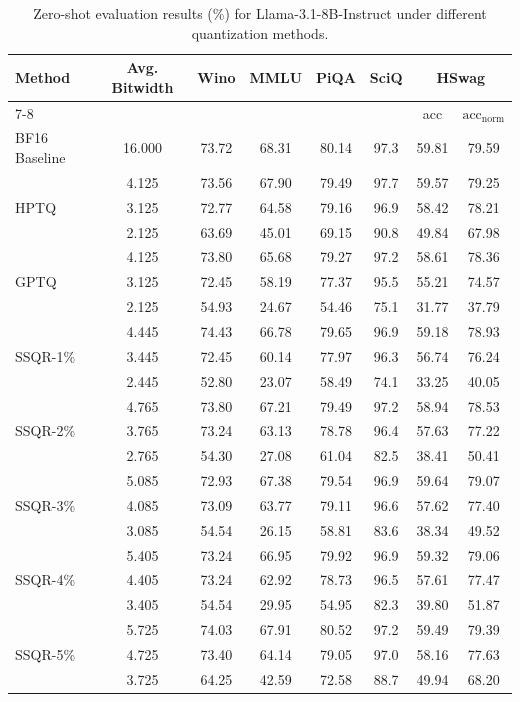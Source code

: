 \documentclass{article} %
\begin{document}
\begin{table}[htpb]
\caption{Zero-shot evaluation results (\%) for Llama-3.1-8B-Instruct under different quantization methods.}
\label{tab:llama3.1_8b_eval_tasks}
\begin{center}
\begin{tabular}{lccccccc}
\toprule
Method & Avg. Bitwidth & Wino & MMLU & PiQA & SciQ & \multicolumn{2}{c}{HSwag}  \\
\cmidrule(r){7-8}
      &           &      &      &      &      & acc & $\text{acc}_\text{norm}$ \\
\midrule
BF16 Baseline & 16.000 & 73.72 & 68.31 & 80.14 & 97.3 & 59.81 & 79.59 \\
\midrule
\multirow{3}{*}{HPTQ} 
 & 4.125 & 73.56 & 67.90 & 79.49 & 97.7 & 59.57 & 79.25 \\
 & 3.125 & 72.77 & 64.58 & 79.16 & 96.9 & 58.42 & 78.21 \\
 & 2.125 & 63.69 & 45.01 & 69.15 & 90.8 & 49.84 & 67.98 \\
\midrule
\multirow{3}{*}{GPTQ} & 4.125 & 73.80 & 65.68 & 79.27 & 97.2 & 58.61 & 78.36 \\
           & 3.125 & 72.45 & 58.19 & 77.37 & 95.5 & 55.21 & 74.57 \\
           & 2.125 & 54.93 & 24.67 & 54.46 & 75.1 & 31.77 & 37.79 \\
\midrule
\multirow{3}{*}{SSQR-1\%} 
 & 4.445 & 74.43 & 66.78 & 79.65 & 96.9 & 59.18 & 78.93 \\
 & 3.445 & 72.45 & 60.14 & 77.97 & 96.3 & 56.74 & 76.24 \\
 & 2.445 & 52.80 & 23.07 & 58.49 & 74.1 & 33.25 & 40.05 \\
\midrule
\multirow{3}{*}{SSQR-2\%}  
 & 4.765 & 73.80 & 67.21 & 79.49 & 97.2 & 58.94 & 78.53 \\
 & 3.765 & 73.24 & 63.13 & 78.78 & 96.4 & 57.63 & 77.22 \\
 & 2.765 & 54.30 & 27.08 & 61.04 & 82.5 & 38.41 & 50.41 \\
\midrule
\multirow{3}{*}{SSQR-3\%}  
 & 5.085 & 72.93 & 67.38 & 79.54 & 96.9 & 59.64 & 79.07 \\
 & 4.085 & 73.09 & 63.77 & 79.11 & 96.6 & 57.62 & 77.40 \\
 & 3.085 & 54.54 & 26.15 & 58.81 & 83.6 & 38.34 & 49.52 \\
\midrule
\multirow{3}{*}{SSQR-4\%}  
 & 5.405 & 73.24 & 66.95 & 79.92 & 96.9 & 59.32 & 79.06 \\
 & 4.405 & 73.24 & 62.92 & 78.73 & 96.5 & 57.61 & 77.47 \\
 & 3.405 & 54.54 & 29.95 & 54.95 & 82.3 & 39.80 & 51.87 \\
\midrule
\multirow{3}{*}{SSQR-5\%}  
 & 5.725 & 74.03 & 67.91 & 80.52 & 97.2 & 59.49 & 79.39 \\
 & 4.725 & 73.40 & 64.14 & 79.05 & 97.0 & 58.16 & 77.63 \\
 & 3.725 & 64.25 & 42.59 & 72.58 & 88.7 & 49.94 & 68.20 \\
\bottomrule
\end{tabular}
\end{center}
\end{table}
\end{document}
